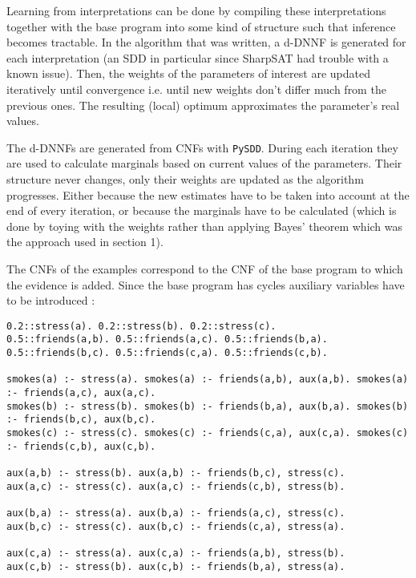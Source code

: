 

Learning from interpretations can be done by compiling these interpretations together with the base program into some kind of structure such that inference becomes tractable. In the algorithm that was written, a d-DNNF is generated for each interpretation (an SDD in particular since SharpSAT had trouble with a known issue). Then, the weights of the parameters of interest are updated iteratively until convergence i.e. until new weights don't differ much from the previous ones. The resulting (local) optimum approximates the parameter's real values.\\

\par\noindent The d-DNNFs are generated from CNFs with \texttt{PySDD}. During each iteration they are used to calculate marginals based on current values of the parameters. Their structure never changes, only their weights are updated as the algorithm progresses. Either because the new estimates have to be taken into account at the end of every iteration, or because the marginals have to be calculated (which is done by toying with the weights rather than applying Bayes' theorem which was the approach used in section 1).\\

\par\noindent The CNFs of the examples correspond to the CNF of the base program to which the evidence is added. Since the base program has cycles auxiliary variables have to be introduced : 

\begin{code}
\begin{verbatim}
0.2::stress(a). 0.2::stress(b). 0.2::stress(c).
0.5::friends(a,b). 0.5::friends(a,c). 0.5::friends(b,a). 
0.5::friends(b,c). 0.5::friends(c,a). 0.5::friends(c,b).

smokes(a) :- stress(a). smokes(a) :- friends(a,b), aux(a,b). smokes(a) :- friends(a,c), aux(a,c).
smokes(b) :- stress(b). smokes(b) :- friends(b,a), aux(b,a). smokes(b) :- friends(b,c), aux(b,c).
smokes(c) :- stress(c). smokes(c) :- friends(c,a), aux(c,a). smokes(c) :- friends(c,b), aux(c,b).

aux(a,b) :- stress(b). aux(a,b) :- friends(b,c), stress(c).
aux(a,c) :- stress(c). aux(a,c) :- friends(c,b), stress(b).

aux(b,a) :- stress(a). aux(b,a) :- friends(a,c), stress(c).
aux(b,c) :- stress(c). aux(b,c) :- friends(c,a), stress(a).

aux(c,a) :- stress(a). aux(c,a) :- friends(a,b), stress(b).
aux(c,b) :- stress(b). aux(c,b) :- friends(b,a), stress(a).
\end{verbatim}
\label{code:base}
\vspace{0.5cm}
\end{code}

